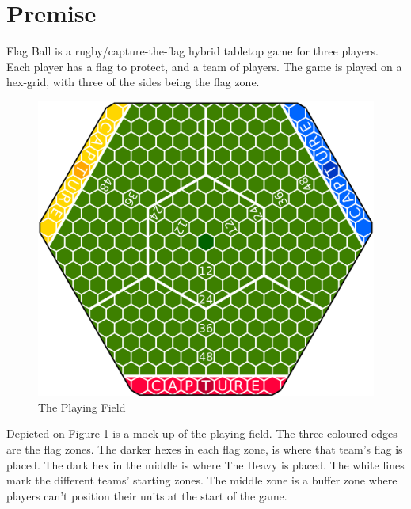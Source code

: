 



\maketitle

\section*{Premise}
Flag Ball is a rugby/capture-the-flag hybrid tabletop game for three players.
Each player has a flag to protect, and a team of players.
The game is played on a hex-grid, with three of the sides being the flag zone.
\begin{figure}
    \centering
    \includegraphics[width=\textwidth]{graphics/board-2}
    \caption{The Playing Field}
    \label{fig:court}
\end{figure}
Depicted on Figure \ref{fig:court} is a mock-up of the playing field.
The three coloured edges are the flag zones.
The darker hexes in each flag zone, is where that team's flag is placed.
The dark hex in the middle is where The Heavy is placed.
The white lines mark the different teams' starting zones.
The middle zone is a buffer zone where players can’t position their units at the start of the game.

\tableofcontents






